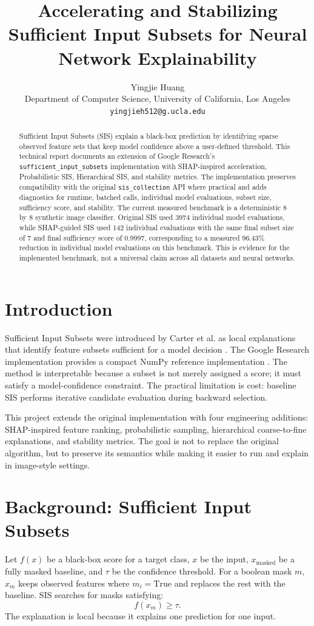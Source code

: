 \documentclass[11pt]{article}
\title{Accelerating and Stabilizing Sufficient Input Subsets for Neural Network Explainability}
\author{Yingjie Huang\\Department of Computer Science, University of California, Los Angeles\\\texttt{yingjieh512@g.ucla.edu}}
\date{}
\begin{document}
\maketitle

\begin{abstract}
Sufficient Input Subsets (SIS) explain a black-box prediction by identifying sparse observed feature sets that keep model confidence above a user-defined threshold. This technical report documents an extension of Google Research's \texttt{sufficient\_input\_subsets} implementation with SHAP-inspired acceleration, Probabilistic SIS, Hierarchical SIS, and stability metrics. The implementation preserves compatibility with the original \texttt{sis\_collection} API where practical and adds diagnostics for runtime, batched calls, individual model evaluations, subset size, sufficiency score, and stability. The current measured benchmark is a deterministic 8 by 8 synthetic image classifier. Original SIS used 3974 individual model evaluations, while SHAP-guided SIS used 142 individual evaluations with the same final subset size of 7 and final sufficiency score of 0.9997, corresponding to a measured 96.43\% reduction in individual model evaluations on this benchmark. This is evidence for the implemented benchmark, not a universal claim across all datasets and neural networks.
\end{abstract}

\section{Introduction}
Sufficient Input Subsets were introduced by Carter et al. as local explanations that identify feature subsets sufficient for a model decision \cite{carter2018sis}. The Google Research implementation provides a compact NumPy reference implementation \cite{googlesis}. The method is interpretable because a subset is not merely assigned a score; it must satisfy a model-confidence constraint. The practical limitation is cost: baseline SIS performs iterative candidate evaluation during backward selection.

This project extends the original implementation with four engineering additions: SHAP-inspired feature ranking, probabilistic sampling, hierarchical coarse-to-fine explanations, and stability metrics. The goal is not to replace the original algorithm, but to preserve its semantics while making it easier to run and explain in image-style settings.

\section{Background: Sufficient Input Subsets}
Let $f(x)$ be a black-box score for a target class, $x$ be the input, $x_{\mathrm{masked}}$ be a fully masked baseline, and $\tau$ be the confidence threshold. For a boolean mask $m$, $x_m$ keeps observed features where $m_i=\mathrm{True}$ and replaces the rest with the baseline. SIS searches for masks satisfying:
\[
f(x_m) \geq \tau.
\]
The explanation is local because it explains one prediction for one input.
\end{document}
